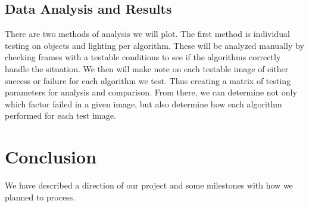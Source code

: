 \documentclass[10pt,draftclsnofoot,onecolumn,journal,compsoc]{IEEEtran}
\begin{document}
\subsection{Data Analysis and Results}
There are two methods of analysis we will plot. 
The first method is individual testing on objects and lighting per algorithm. 
These will be analyzed manually by checking frames with a testable conditions to see if the algorithms correctly handle the situation.
We then will make note on each testable image of either success or failure for each algorithm we test.
Thus creating a matrix of testing parameters for analysis and comparison.
From there, we can determine not only which factor failed in a given image, but also determine how each algorithm performed for each test image. 

\section{Conclusion}
We have described a direction of our project and some milestones with how we planned to process.
      
\newpage
\newcommand{\firstdayoffallterm}{2016-09-21}      %
\newcommand{\startday}{2016-10-02}                %
\newcommand{\fallprogressreportdue}{2016-12-05}   %
\newcommand{\alphareleasedue}{2017-02-13}         %
\newcommand{\betareleasedue}{2017-03-20}          %
\newcommand{\winterprogressreportdue}{2017-03-20} %
\newcommand{\releasedue}{2017-05-15}              %
\newcommand{\expoday}{2017-05-19}                 %
\newcommand{\finalreportdue}{2017-06-12}          %
\newcommand{\lastdayofspringterm}{2017-06-16}     %
\end{document}

